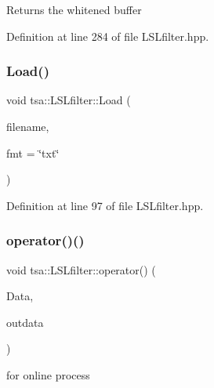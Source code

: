 \begin{DoxyReturn}{Returns}
the whitened buffer 
\end{DoxyReturn}


Definition at line 284 of file L\+S\+Lfilter.\+hpp.

\mbox{\label{classtsa_1_1_l_s_lfilter_a737d772a9b51efdd71a01178ec83597f}} 
\subsubsection{\texorpdfstring{Load()}{Load()}}
{\footnotesize\ttfamily void tsa\+::\+L\+S\+Lfilter\+::\+Load (\begin{DoxyParamCaption}\item[{const char $\ast$}]{filename,  }\item[{const char $\ast$}]{fmt = {\ttfamily \char`\"{}txt\char`\"{}} }\end{DoxyParamCaption})\hspace{0.3cm}{\ttfamily [inline]}}



Definition at line 97 of file L\+S\+Lfilter.\+hpp.

\mbox{\label{classtsa_1_1_l_s_lfilter_a7a6f64f53279b310e23cb034ab1d9a99}} 
\subsubsection{\texorpdfstring{operator()()}{operator()()}}
{\footnotesize\ttfamily void tsa\+::\+L\+S\+Lfilter\+::operator() (\begin{DoxyParamCaption}\item[{\hyperlink{namespacetsa_ac599574bcc094eda25613724b8f3ca9e}{Seq\+View\+Double} \&}]{Data,  }\item[{\hyperlink{namespacetsa_ac599574bcc094eda25613724b8f3ca9e}{Seq\+View\+Double} \&}]{outdata }\end{DoxyParamCaption})\hspace{0.3cm}{\ttfamily [inline]}}



for online process 


